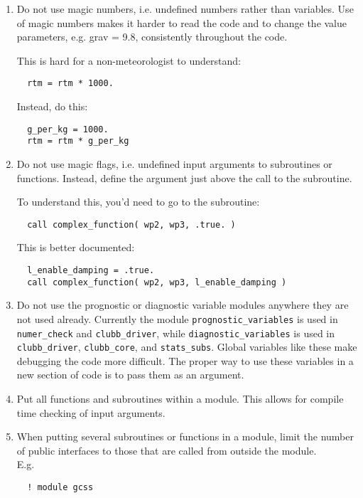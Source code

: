 \documentclass[letterpaper,12pt]{article}
\begin{document}
\begin{enumerate}
\item  Do not use magic numbers, i.e. undefined numbers rather than variables.
Use of magic numbers makes it harder to read the code and to change the value 
parameters, e.g. grav = 9.8, consistently throughout the code.

This is hard for a non-meteorologist to understand: 
\begin{verbatim}
  rtm = rtm * 1000. 
\end{verbatim}

Instead, do this:
\begin{verbatim}
  g_per_kg = 1000.
  rtm = rtm * g_per_kg
\end{verbatim}

\item  Do not use magic flags, i.e. undefined input arguments to subroutines or 
functions.  Instead, define the argument just above the call to the subroutine.

To understand this, you'd need to go to the subroutine: 
\begin{verbatim}
  call complex_function( wp2, wp3, .true. ) 
\end{verbatim}

This is better documented:
\begin{verbatim}
  l_enable_damping = .true.
  call complex_function( wp2, wp3, l_enable_damping )
\end{verbatim}

\item Do not use the prognostic or diagnostic variable modules anywhere they
are not used already.  Currently the module \texttt{prognostic\_variables} 
is used in 
\texttt{numer\_check} and \texttt{clubb\_driver}, while 
\texttt{diagnostic\_variables} is used in \texttt{clubb\_driver}, 
\texttt{clubb\_core}, 
and \texttt{stats\_subs}. Global variables like these make debugging 
the code more difficult.  The proper way to use these variables in a new 
section of code is to pass them as an argument.
\newline

\item Put all functions and subroutines within a module.  This allows for 
compile time checking of input arguments. \newline

\item When putting several subroutines or functions in a module, limit the
 number of public interfaces to those that are called from outside the 
 module.\\
E.g. 
\begin{verbatim}
  ! module gcss


\end{verbatim}
\end{enumerate}
\end{document}
